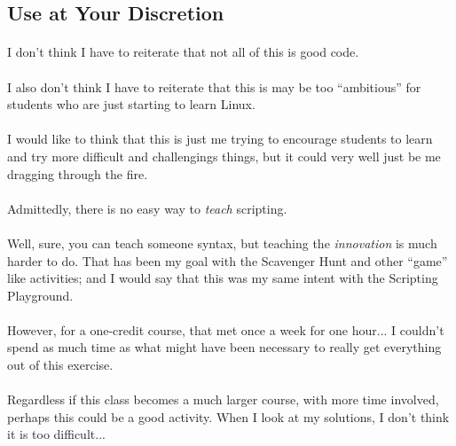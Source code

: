 \documentclass[11pt]{article}
\begin{document}
	\hrulefill

	\newpage

	\subsection{Use at Your Discretion}

	\paragraph{} I don't think I have to reiterate that not all of this is good code.

	\paragraph{} I also don't think I have to reiterate that this is may be too ``ambitious'' for students who are just starting to learn Linux.

	\paragraph{} I would like to think that this is just me trying to encourage students to learn and try more difficult and challengings things, but it could very well just be me dragging through the fire.

	\paragraph{} Admittedly, there is no easy way to \textit{teach} scripting.

	\paragraph{} Well, sure, you can teach someone syntax, but teaching the \textit{innovation} is much harder to do. That has been my goal with the Scavenger Hunt and other ``game'' like activities; and I would say that this was my same intent with the Scripting Playground. 

	\paragraph{} However, for a one-credit course, that met once a week for one hour... I couldn't spend as much time as what might have been necessary to really get everything out of this exercise.

	\paragraph{} Regardless if this class becomes a much larger course, with more time involved, perhaps this could be a good activity. When I look at my solutions, I don't think it is too difficult...
\end{document}
